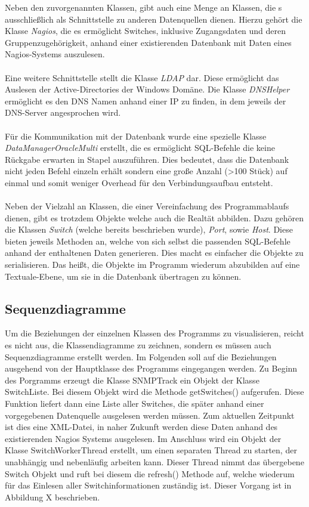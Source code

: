 Neben den zuvorgenannten Klassen, gibt auch eine Menge an Klassen, die s ausschließlich als Schnittstelle zu anderen Datenquellen dienen.
Hierzu gehört die Klasse \textit{Nagios}, die es ermöglicht Switches, inklusive Zugangsdaten und deren Gruppenzugehörigkeit, anhand einer existierenden Datenbank mit Daten eines Nagios-Systems auszulesen.\\\\
Eine weitere Schnittstelle stellt die Klasse \textit{LDAP} dar. Diese ermöglicht das Auslesen der Active-Directories der Windows Domäne.
Die Klasse \textit{DNSHelper} ermöglicht es den DNS Namen anhand einer IP zu finden, in dem jeweils der DNS-Server angesprochen wird.\\\\
Für die Kommunikation mit der Datenbank wurde eine spezielle Klasse \textit{DataManagerOracleMulti} erstellt, die es ermöglicht SQL-Befehle die keine Rückgabe erwarten in Stapel auszuführen.
Dies bedeutet, dass die Datenbank nicht jeden Befehl einzeln erhält sondern eine große Anzahl (>100 Stück) auf einmal und somit weniger Overhead für den Verbindungsaufbau entsteht.\\\\
Neben der Vielzahl an Klassen, die einer Vereinfachung des Programmablaufs dienen, gibt es trotzdem Objekte welche auch die Realtät abbilden.
Dazu gehören die Klassen \textit{Switch} (welche bereits beschrieben wurde), \textit{Port}, sowie \textit{Host}.
Diese bieten jeweils Methoden an, welche von sich selbst die passenden SQL-Befehle anhand der enthaltenen Daten generieren. Dies macht es einfacher die Objekte zu serialisieren.
Das heißt, die Objekte im Programm wiederum abzubilden auf eine Textuale-Ebene, um sie in die Datenbank übertragen zu können.\\


\subsection{Sequenzdiagramme}
\label{subsec:seqdiagrams}

Um die Beziehungen der einzelnen Klassen des Programms zu visualisieren, reicht es nicht aus, die Klassendiagramme zu zeichnen, sondern es müssen auch Sequenzdiagramme erstellt werden.
Im Folgenden soll auf die Beziehungen ausgehend von der Hauptklasse des Programms eingegangen werden.
Zu Beginn des Porgramms erzeugt die Klasse SNMPTrack ein Objekt der Klasse SwitchListe.
Bei diesem Objekt wird die Methode getSwitches() aufgerufen.
Diese Funktion liefert dann eine Liste aller Switches, die später anhand einer vorgegebenen Datenquelle ausgelesen werden müssen.
Zum aktuellen Zeitpunkt ist dies eine XML-Datei, in naher Zukunft werden diese Daten anhand des existierenden Nagios Systems ausgelesen. Im Anschluss wird ein Objekt der Klasse SwitchWorkerThread erstellt, um einen separaten Thread zu starten, der unabhängig und nebenläufig arbeiten kann. Dieser Thread nimmt das übergebene Switch Objekt und ruft bei diesem die refresh() Methode auf, welche wiederum für das Einlesen aller Switchinformationen zuständig ist. Dieser Vorgang ist in Abbildung X beschrieben.


